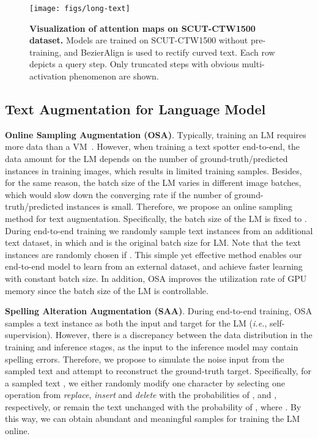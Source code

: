 \documentclass[10pt,journal,compsoc]{IEEEtran}
\def\ie{{\it i.e.}\xspace}
\begin{document}
\begin{figure}
   \begin{center}
      \texttt{[image: figs/long-text]}
      \caption{\textbf{Visualization of attention maps on SCUT-CTW1500 dataset.} Models are trained on SCUT-CTW1500 without pre-training, and BezierAlign is used to rectify curved text. Each row depicts a query step. Only truncated steps with obvious multi-activation phenomenon are shown.}
      \label{fig:long-text}
   \end{center}
   \vspace{-1.5em}     
\end{figure}



\subsection{Text Augmentation for Language Model}
\label{sec:text-aug}

\indent\textbf{Online Sampling Augmentation (OSA)}. Typically, training an LM requires more data than a VM~\cite{radford2018improving,qin2019towards}. However, when training a text spotter end-to-end, the data amount for the LM depends on the number of ground-truth/predicted instances in training images, which results in limited training samples. Besides, for the same reason, the batch size of the LM varies in different image batches, which would slow down the converging rate if the number of ground-truth/predicted instances is small. Therefore, we propose an online sampling method for text augmentation. Specifically, the batch size of the LM is fixed to . During end-to-end training we randomly sample  text instances from an additional text dataset, in which  and  is the original batch size for LM. Note that the  text instances are randomly chosen if . This simple yet effective method enables our end-to-end model to learn from an external dataset, and achieve faster learning with constant batch size. In addition, OSA improves the utilization rate of GPU memory since the batch size of the LM is controllable.


\indent\textbf{Spelling Alteration Augmentation (SAA)}. During end-to-end training, OSA samples a text instance  as both the input and target for the LM (\ie, self-supervision). However, there is a discrepancy between the data distribution in the training and inference stages, as the input to the inference model may contain spelling errors. Therefore, we propose to simulate the noise input from the sampled text and attempt to reconstruct the ground-truth target. Specifically, for a sampled text , we either randomly modify one character by selecting one operation from \emph{replace}, \emph{insert} and \emph{delete} with the probabilities of ,  and , respectively, or remain the text unchanged with the probability of , where . By this way, we can obtain abundant and meaningful samples for training the LM online.
\end{document}
